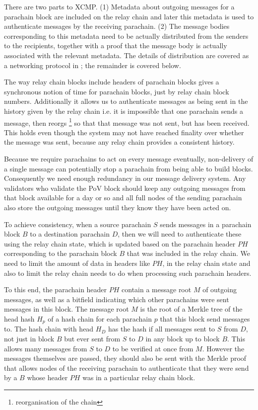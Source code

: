 There are two parts to XCMP. (1) Metadata about outgoing messages for a parachain block are included on the relay chain and later this metadata is used to authenticate messages by the receiving parachain. (2) The message bodies corresponding to this metadata need to be actually distributed from the senders to the recipients, together with a proof that the message body is actually associated with the relevant metadata. The details of distribution are covered as a networking protocol in ; the remainder is covered below.

The way relay chain blocks include headers of parachain blocks gives a synchronous notion of time for parachain blocks, just by relay chain block numbers. Additionally it allows us to authenticate messages as being sent in the history given by the relay chain i.e. it is impossible that one parachain sends a message, then reorgs \footnote{reorganisation of the chain} so that that message was not sent, but has been received. This holds even though the system may not have reached finality over whether the message was sent, because any relay chain provides a consistent history.

Because we require parachains to act on every message eventually, non-delivery of a single message can potentially stop a parachain from being able to build blocks. Consequently we need enough redundancy in our message delivery system. Any validators who validate the PoV block should keep any outgoing messages from that block available for a day or so and all full nodes of the sending parachain also store the outgoing messages until they know they have been acted on.

To achieve consistency, when a source parachain $S$ sends messages in a parachain block $B$ to a destination parachain $D$, then we will need to authenticate these using the relay chain state, which is updated based on the parachain header $PH$ corresponding to the parachain block $B$ that was included in the relay chain. We need to limit the amount of data in headers like $PH$, in the relay chain state and also to limit the relay chain needs to do when processing such parachain headers.

To this end, the parachain header $PH$ contain a message root $M$ of outgoing messages, as well as a bitfield indicating which other parachains were sent messages in this block.
The message root $M$ is the root of a Merkle tree of the head hash $H_p$ of a hash chain for each parachain $p$ that this block send messages to.  The hash chain with head $H_D$ has the hash if all messages sent to $S$ from $D$, not just in block $B$ but ever sent from $S$ to $D$ in any block up to block $B$. This allows many messages from $S$ to $D$  to be verified at once from $M$. However the messages themselves are passed, they should also be sent with the Merkle proof that allows nodes of the receiving parachain
to authenticate that they were send by a $B$ whose header  $PH$ was in a particular relay chain block.

